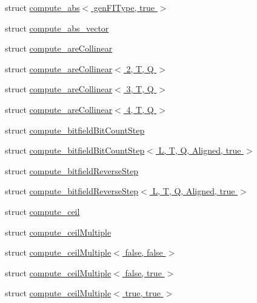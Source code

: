 \begin{DoxyCompactItemize}
struct \hyperlink{structglm_1_1detail_1_1compute__abs_3_01gen_f_i_type_00_01true_01_4}{compute\+\_\+abs$<$ gen\+F\+I\+Type, true $>$}
\item 
struct \hyperlink{structglm_1_1detail_1_1compute__abs__vector}{compute\+\_\+abs\+\_\+vector}
\item 
struct \hyperlink{structglm_1_1detail_1_1compute__are_collinear}{compute\+\_\+are\+Collinear}
\item 
struct \hyperlink{structglm_1_1detail_1_1compute__are_collinear_3_012_00_01_t_00_01_q_01_4}{compute\+\_\+are\+Collinear$<$ 2, T, Q $>$}
\item 
struct \hyperlink{structglm_1_1detail_1_1compute__are_collinear_3_013_00_01_t_00_01_q_01_4}{compute\+\_\+are\+Collinear$<$ 3, T, Q $>$}
\item 
struct \hyperlink{structglm_1_1detail_1_1compute__are_collinear_3_014_00_01_t_00_01_q_01_4}{compute\+\_\+are\+Collinear$<$ 4, T, Q $>$}
\item 
struct \hyperlink{structglm_1_1detail_1_1compute__bitfield_bit_count_step}{compute\+\_\+bitfield\+Bit\+Count\+Step}
\item 
struct \hyperlink{structglm_1_1detail_1_1compute__bitfield_bit_count_step_3_01_l_00_01_t_00_01_q_00_01_aligned_00_01true_01_4}{compute\+\_\+bitfield\+Bit\+Count\+Step$<$ L, T, Q, Aligned, true $>$}
\item 
struct \hyperlink{structglm_1_1detail_1_1compute__bitfield_reverse_step}{compute\+\_\+bitfield\+Reverse\+Step}
\item 
struct \hyperlink{structglm_1_1detail_1_1compute__bitfield_reverse_step_3_01_l_00_01_t_00_01_q_00_01_aligned_00_01true_01_4}{compute\+\_\+bitfield\+Reverse\+Step$<$ L, T, Q, Aligned, true $>$}
\item 
struct \hyperlink{structglm_1_1detail_1_1compute__ceil}{compute\+\_\+ceil}
\item 
struct \hyperlink{structglm_1_1detail_1_1compute__ceil_multiple}{compute\+\_\+ceil\+Multiple}
\item 
struct \hyperlink{structglm_1_1detail_1_1compute__ceil_multiple_3_01false_00_01false_01_4}{compute\+\_\+ceil\+Multiple$<$ false, false $>$}
\item 
struct \hyperlink{structglm_1_1detail_1_1compute__ceil_multiple_3_01false_00_01true_01_4}{compute\+\_\+ceil\+Multiple$<$ false, true $>$}
\item 
struct \hyperlink{structglm_1_1detail_1_1compute__ceil_multiple_3_01true_00_01true_01_4}{compute\+\_\+ceil\+Multiple$<$ true, true $>$}
\item 

\end{DoxyCompactItemize}
